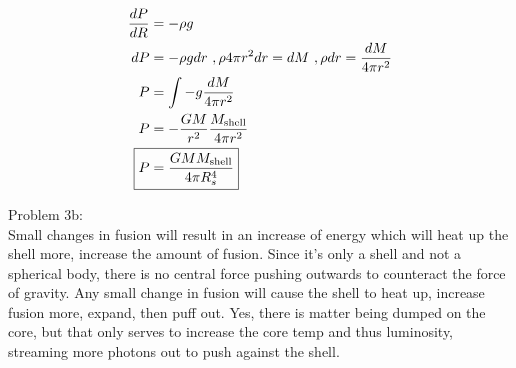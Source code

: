 \documentclass[10pt,letter,preprint]{aastex}
\begin{document}
\begin{align}
\frac{dP}{dR} &= -\rho g\\
dP &= -\rho g dr~,\rho 4 \pi r^2 dr = dM~,\rho dr = \frac{dM}{4 \pi r^2}\\
P &= \int -g \frac{dM}{4 \pi r^2}\\
P &= -\frac{GM}{r^2}\frac{M_{\textrm{shell}}}{4 \pi r^2}\\
\Aboxed{P &= \frac{GMM_{\textrm{shell}}}{4\pi R_s^4}}
\end{align}

Problem 3b:\\
Small changes in fusion will result in an increase of energy which will heat up the shell more, increase the amount of fusion. Since it's only a shell and not a spherical body, there is no central force pushing outwards to counteract the force of gravity. Any small change in fusion will cause the shell to heat up, increase fusion more, expand, then puff out. Yes, there is matter being dumped on the core, but that only serves to increase the core temp and thus luminosity, streaming more photons out to push against the shell. 
\end{document}
